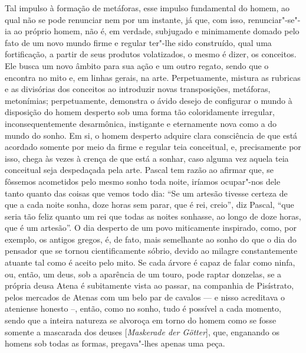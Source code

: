 Tal impulso à formação de metáforas, esse impulso fundamental do homem,
ao qual não se pode renunciar nem por um instante, já que, com isso,
renunciar"-se"-ia ao próprio homem, não é, em verdade, subjugado e
minimamente domado pelo fato de um novo mundo firme e regular ter"-lhe
sido construído, qual uma fortificação, a partir de seus produtos
volatizados, o mesmo é dizer, os conceitos. Ele busca um novo âmbito
para sua ação e um outro regato, sendo que o encontra no mito e, em
linhas gerais, na arte. Perpetuamente, mistura as rubricas e as
divisórias dos conceitos ao introduzir novas transposições, metáforas,
metonímias; perpetuamente, demonstra o ávido desejo de configurar
o mundo à disposição do homem desperto sob uma forma tão coloridamente
irregular, inconsequentemente desarmônica, instigante e eternamente
nova como a do mundo do sonho. Em si, o homem desperto adquire clara
consciência de que está acordado somente por meio da firme e regular
teia conceitual, e, precisamente por isso, chega às vezes à crença de
que está a sonhar, caso alguma vez aquela teia conceitual seja despedaçada
pela arte. Pascal tem razão ao afirmar que, 
se fôssemos acometidos pelo mesmo sonho toda noite, iríamos ocupar"-nos dele tanto
quanto das coisas que vemos todo dia: “Se um artesão tivesse certeza de
que a cada noite sonha, doze horas sem parar, que é rei, creio”, diz
Pascal, “que seria tão feliz quanto um rei que todas as noites sonhasse,
ao longo de doze horas, que é um artesão”. O dia desperto de um povo
miticamente inspirado, como, por exemplo, os antigos gregos, é, de
fato, mais semelhante ao sonho do que o dia do pensador que se tornou
cientificamente sóbrio, devido ao milagre constantemente atuante tal
como é aceito pelo mito. Se cada árvore é capaz de falar como ninfa,
ou, então, um deus, sob a aparência de um touro, pode raptar donzelas,
se a própria deusa Atena é subitamente vista ao passar, na companhia de
Pisístrato, pelos mercados de Atenas com um belo par de cavalos --- e
nisso acreditava o ateniense honesto --, então, como no sonho, tudo é
possível a cada momento, sendo que a inteira natureza se alvoroça em
torno do homem como se fosse somente a mascarada dos deuses
[\textit{Maskerade der Götter}], que, enganando os homens sob todas as
formas, pregava"-lhes apenas uma peça.

